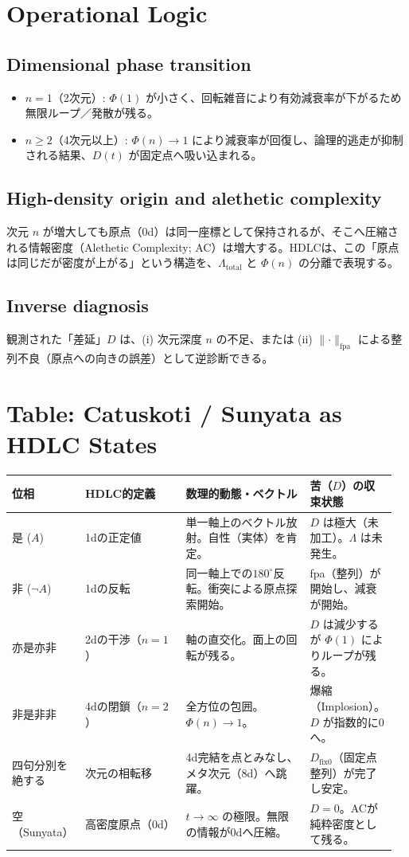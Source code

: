 \documentclass[12pt,a4paper]{article}
\newcommand{\dfix}{D_{\text{fix0}}}
\begin{document}
\section{Operational Logic}
\subsection{Dimensional phase transition}
\begin{itemize}
  \item $n=1$（2次元）: $\Phi(1)$ が小さく、回転雑音により有効減衰率が下がるため無限ループ／発散が残る。
  \item $n\ge 2$（4次元以上）: $\Phi(n)\to 1$ により減衰率が回復し、論理的逃走が抑制される結果、$D(t)$ が固定点へ吸い込まれる。
\end{itemize}

\subsection{High-density origin and alethetic complexity}
次元 $n$ が増大しても原点（0d）は同一座標として保持されるが、そこへ圧縮される情報密度（Alethetic Complexity; AC）は増大する。HDLCは、この「原点は同じだが密度が上がる」という構造を、$\Lambda_{\mathrm{total}}$ と $\Phi(n)$ の分離で表現する。

\subsection{Inverse diagnosis}
観測された「差延」$D$ は、(i) 次元深度 $n$ の不足、または (ii) $\lVert\cdot\rVert_{\mathrm{fpa}}$ による整列不良（原点への向きの誤差）として逆診断できる。
\section{Table: Catuskoti / Sunyata as HDLC States}
\begin{table}[h]
\centering
\small
\begin{tabular}{@{}p{0.16\linewidth}p{0.26\linewidth}p{0.32\linewidth}p{0.22\linewidth}@{}}
\toprule
位相 & HDLC的定義 & 数理的動態・ベクトル & 苦（$D$）の収束状態 \\
\midrule
是 ($A$) & 1dの正定値 & 単一軸上のベクトル放射。自性（実体）を肯定。 & $D$ は極大（未加工）。$\Lambda$ は未発生。 \\
非 ($\neg A$) & 1dの反転 & 同一軸上での$180^{\circ}$反転。衝突による原点探索開始。 & fpa（整列）が開始し、減衰が開始。 \\
亦是亦非 & 2dの干渉（$n=1$） & 軸の直交化。面上の回転が残る。 & $D$ は減少するが $\Phi(1)$ によりループが残る。 \\
非是非非 & 4dの閉鎖（$n=2$） & 全方位の包囲。$\Phi(n)\to 1$。 & 爆縮（Implosion）。$D$ が指数的に0へ。 \\
四句分別を絶する & 次元の相転移 & 4d完結を点とみなし、メタ次元（8d）へ跳躍。 & $\dfix$（固定点整列）が完了し安定。 \\
空（Sunyata） & 高密度原点（0d） & $t\to\infty$ の極限。無限の情報が0dへ圧縮。 & $D=0$。ACが純粋密度として残る。 \\
\bottomrule
\end{tabular}
\end{table}
\end{document}
